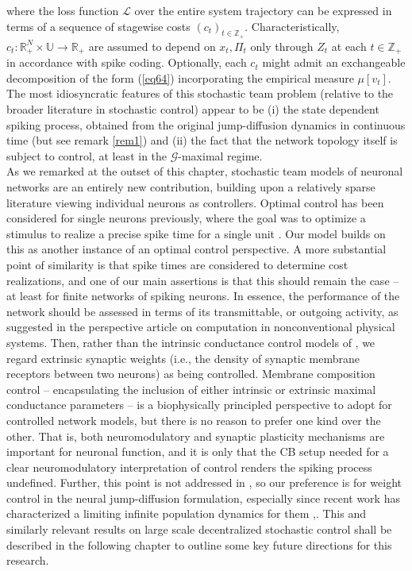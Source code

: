 \documentclass[12pt, oneside]{report}
\newcommand{\mbb}[1]{\mathbb{#1}}
\newcommand{\1}[1]{\mathbbm{1}_{\{#1\}}}
\newcommand{\mc}[1]{\mathcal{#1}}
\theoremstyle{definition}
\begin{document}
where the loss function $\mc{L}$ over the entire system trajectory can be
expressed in terms of a sequence of stagewise costs $(c_t)_{t\in\mbb{Z}_+}$.
Characteristically, $c_t:\mbb{R}^{N}_+\times\mbb{U}\rightarrow\mbb{R}_+$ are
assumed to depend on $x_t,\Pi_t$ only through $Z_t$ at each $t\in\mbb{Z}_+$ in
accordance with spike coding. Optionally, each $c_t$ might admit an exchangeable
decomposition of the form (\ref{eq64}) incorporating the empirical measure
$\mu[v_t]$. The most idiosyncratic features of this stochastic team problem
(relative to the broader literature in stochastic control) appear to be (i) the
state dependent spiking process, obtained from the original jump-diffusion
dynamics in continuous time (but see remark \ref{rem1}) and (ii) the fact that
the network topology itself is subject to control, at least in the
$\mc{G}$-maximal regime.\\[5pt] 
\indent As we remarked at the outset of this chapter, stochastic team models of
neuronal networks are an entirely new contribution, building upon a relatively
sparse literature viewing individual neurons as controllers. Optimal control has
been considered for single neurons previously, where the goal was to optimize a
stimulus to realize a precise spike time for a single unit
\cite{Iolov_Ditlevsen_Longtin_2014}. Our model builds on this as another
instance of an optimal control perspective. A more substantial point of
similarity is that spike times are considered to determine cost realizations,
and one of our main assertions is that this should remain the case -- at least
for finite networks of spiking neurons. In essence, the performance of the
network should be assessed in terms of its transmittable, or outgoing activity,
as suggested in the perspective article \cite{Jaeger_Noheda_vanderWiel_2023} on
computation in nonconventional physical systems. Then, rather than the intrinsic
conductance control models of \cite{Sepulchre_2022}, we regard extrinsic
synaptic weights (i.e., the density of synaptic membrane receptors between two
neurons) as being controlled. Membrane composition control -- encapsulating the
inclusion of either intrinsic or extrinsic maximal conductance parameters -- is
a biophysically principled perspective to adopt for controlled network models,
but there is no reason to prefer one kind over the other. That is, both
neuromodulatory and synaptic plasticity mechanisms are important for neuronal
function, and it is only that the CB setup needed for a clear neuromodulatory
interpretation of control renders the spiking process undefined. Further, this
point is not addressed in \cite{Burghi_Sepulchre_2023},\cite{Sepulchre_2022} so
our preference is for weight control in the neural jump-diffusion formulation,
especially since recent work has characterized a limiting infinite population
dynamics for them \cite{Jabin_Poyato_Soler_2021},\cite{Jabin_Schmutz_Zhou_2024}.
This and similarly relevant results on large scale decentralized stochastic
control  shall be described in the following chapter to outline some key future
directions for this research.
\end{document}
